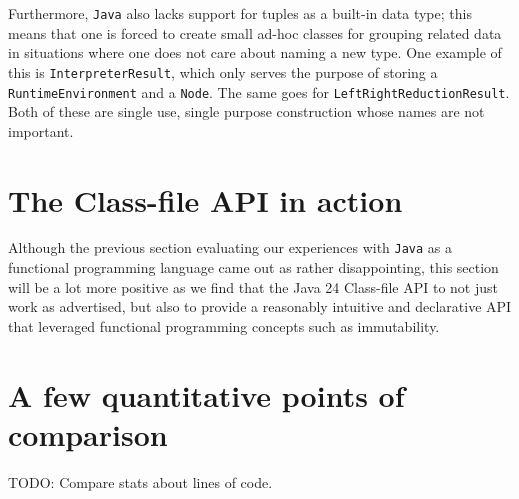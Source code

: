 Furthermore, \texttt{Java} also lacks support for tuples as a built-in data type; this means that one is forced to create small ad-hoc
classes for grouping related data in situations where one does not care about naming a new type. One example of this is \texttt{InterpreterResult},
which only serves the purpose of storing a \texttt{RuntimeEnvironment} and a \texttt{Node}. The same goes for \texttt{LeftRightReductionResult}.
Both of these are single use, single purpose construction whose names are not important.

\section{The Class-file API in action}

Although the previous section evaluating our experiences with \texttt{Java} as a functional programming language came out as rather disappointing,
this section will be a lot more positive as we find that the Java 24 Class-file API to not just work as advertised, but also to provide a
reasonably intuitive and declarative API that leveraged functional programming concepts such as immutability.

\section{A few quantitative points of comparison}

TODO: Compare stats about lines of code.
